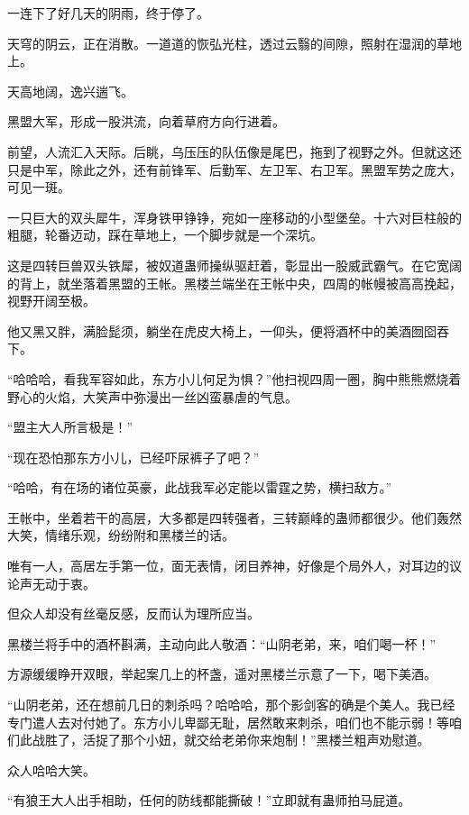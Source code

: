 
\begin{this_body}

一连下了好几天的阴雨，终于停了。

天穹的阴云，正在消散。一道道的恢弘光柱，透过云翳的间隙，照射在湿润的草地上。

天高地阔，逸兴遄飞。

黑盟大军，形成一股洪流，向着草府方向行进着。

前望，人流汇入天际。后眺，乌压压的队伍像是尾巴，拖到了视野之外。但就这还只是中军，除此之外，还有前锋军、后勤军、左卫军、右卫军。黑盟军势之庞大，可见一斑。

一只巨大的双头犀牛，浑身铁甲铮铮，宛如一座移动的小型堡垒。十六对巨柱般的粗腿，轮番迈动，踩在草地上，一个脚步就是一个深坑。

这是四转巨兽双头铁犀，被奴道蛊师操纵驱赶着，彰显出一股威武霸气。在它宽阔的背上，就坐落着黑盟的王帐。黑楼兰端坐在王帐中央，四周的帐幔被高高挽起，视野开阔至极。

他又黑又胖，满脸髭须，躺坐在虎皮大椅上，一仰头，便将酒杯中的美酒囫囵吞下。

“哈哈哈，看我军容如此，东方小儿何足为惧？”他扫视四周一圈，胸中熊熊燃烧着野心的火焰，大笑声中弥漫出一丝凶蛮暴虐的气息。

“盟主大人所言极是！”

“现在恐怕那东方小儿，已经吓尿裤子了吧？”

“哈哈，有在场的诸位英豪，此战我军必定能以雷霆之势，横扫敌方。”

王帐中，坐着若干的高层，大多都是四转强者，三转巅峰的蛊师都很少。他们轰然大笑，情绪乐观，纷纷附和黑楼兰的话。

唯有一人，高居左手第一位，面无表情，闭目养神，好像是个局外人，对耳边的议论声无动于衷。

但众人却没有丝毫反感，反而认为理所应当。

黑楼兰将手中的酒杯斟满，主动向此人敬酒：“山阴老弟，来，咱们喝一杯！”

方源缓缓睁开双眼，举起案几上的杯盏，遥对黑楼兰示意了一下，喝下美酒。

“山阴老弟，还在想前几日的刺杀吗？哈哈哈，那个影剑客的确是个美人。我已经专门遣人去对付她了。东方小儿卑鄙无耻，居然敢来刺杀，咱们也不能示弱！等咱们此战胜了，活捉了那个小妞，就交给老弟你来炮制！”黑楼兰粗声劝慰道。

众人哈哈大笑。

“有狼王大人出手相助，任何的防线都能撕破！”立即就有蛊师拍马屁道。


\end{this_body}

